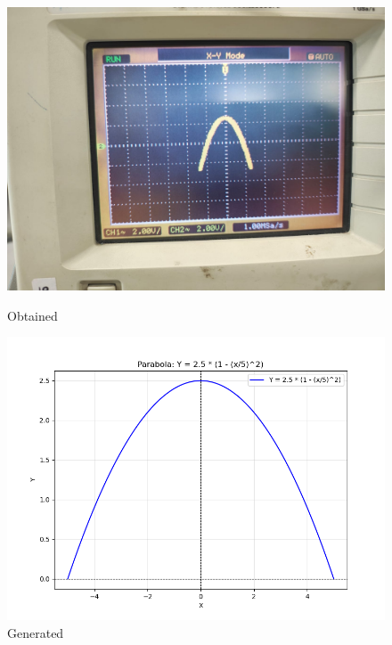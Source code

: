 \documentclass[a4paper,12pt]{article}
\numberwithin{equation}{section} %
\begin{document}
\begin{figure}[htbp]
    \centering
    \begin{minipage}{0.45\textwidth}
        \centering
        \includegraphics[width=\linewidth]{Graphs/Graph3.jpeg}
        \caption{Obtained}
    \end{minipage}
    \hfill
    \begin{minipage}{0.45\textwidth}
        \centering
        \includegraphics[width=\linewidth]{Python plots/lab5.png} 
        \caption{Generated}
    \end{minipage}
\end{figure}\\
\newpage
\end{document}
